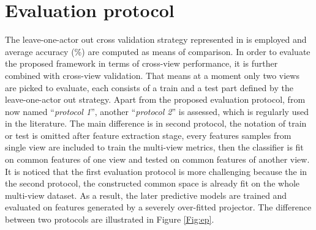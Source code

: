 
\section{Evaluation protocol}
    The leave-one-actor out cross validation strategy represented in \cite{Stone1974} is employed and average accuracy (\%) are computed as means of comparison.
    In order to evaluate the proposed framework in terms of cross-view performance, it is further combined with cross-view validation.
    That means at a moment only two views are picked to evaluate, each consists of a train and a test part defined by the leave-one-actor out strategy.
    Apart from the proposed evaluation protocol, from now named ``\emph{protocol 1}'', another ``\emph{protocol 2}'' is assessed, which is regularly used in the literature.
    The main difference is in second protocol, the notation of train or test is omitted after feature extraction stage, every features samples from single view are included to train the multi-view metrics, then the classifier is fit on common features of one view and tested on common features of another view.
    It is noticed that the first evaluation protocol is more challenging because the in the second protocol, the constructed common space is already fit on the whole multi-view dataset. As a result, the later predictive models are trained and evaluated on features generated by a severely over-fitted projector. %
    The difference between two protocols are illustrated in Figure \ref{Fig:ep}. 


